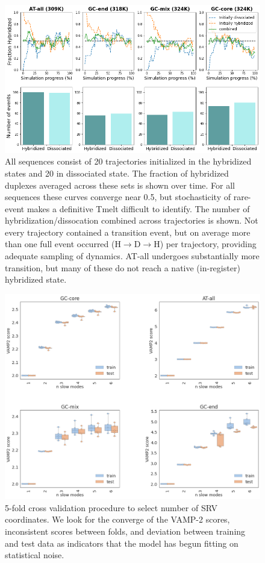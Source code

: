 \documentclass[journal=jpcbfk,manuscript=article]{achemso}
\begin{document}
\begin{figure}[ht!]
	\begin{center}
        \includegraphics[width=120mm, 
        scale=0.5]{Figs/figs_imp/allseq_event_count.png}
        \caption{All sequences consist of 20 trajectories initialized in the hybridized states and 20 in dissociated state. The fraction of hybridized duplexes averaged across these sets is shown over time. For all sequences these curves converge near 0.5, but stochasticity of rare-event makes a definitive Tmelt difficult to identify. The number of hybridization/dissocation combined across trajectories is shown. Not every trajectory contained a transition event, but on average more than one full event occurred (H$\rightarrow$D$\rightarrow$H) per trajectory, providing adequate sampling of dynamics. AT-all undergoes substantially more transition, but many of these do not reach a native (in-register) hybridized state.}
        \label{fig:allseq_event_count}
	\end{center}
\end{figure}


\begin{figure}[ht!]
	\begin{center}
        \includegraphics[width=120mm, 
        scale=0.5]{Figs/figs_imp/allseq_crossval.png}
        \caption{5-fold cross validation procedure to select number of SRV coordinates. We look for the converge of the VAMP-2 scores, inconsistent scores between folds, and deviation between training and test data as indicators that the model has begun fitting on statistical noise.}
        \label{fig:allseq_srv_crossval}
	\end{center}
\end{figure}
\end{document}
